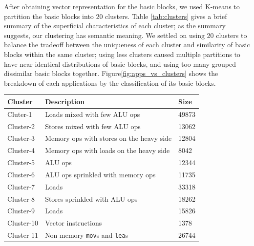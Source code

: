 After obtaining vector representation for the basic blocks, 
we used K-means\cite{kmeans} to partition the basic blocks into 20 clusters.
Table \ref{tab:clusters} gives a brief summary of the superficial characteristics
of each cluster; as the summary suggests, our clustering has semantic meaning.
We settled on using 20 clusters to balance
the tradeoff between the uniqueness of each cluster
and similarity of basic blocks within the same cluster;
using less clusters caused multiple partitions to have
near identical distributions of basic blocks,
and using too many grouped dissimilar basic blocks together.
Figure\ref{fig:apps_vs_clusters} shows the breakdown of each applications
by the classification of its basic blocks.
\begin{table}
\begin{tabular}{|p{}|p{}|p{}|}
    \hline
    Cluster & Description & Size \\
    \hline
    
    Cluter-1 & 
    Loads mixed with few ALU ops & 49873 \\
    \hline
    
    Cluster-2 &
    Stores mixed with few ALU ops & 13062 \\
    \hline
    
    Cluster-3 &
    Memory ops with stores on the heavy side & 12804 \\
    \hline
    
    Cluster-4 &
    Memory ops with loads on the heavy side & 8042 \\
    \hline
    
    Cluster-5 &
    ALU ops & 12344 \\
    \hline
    
    Cluster-6 &
    ALU ops sprinkled with memory ops & 11735 \\
    \hline
    
    Cluster-7 &
    Loads & 33318 \\
    \hline
    
    Cluster-8 &
    Stores sprinkled with ALU ops & 18262 \\
    \hline
    
    Cluster-9 &
    Loads & 15826 \\
    \hline
    
    Cluster-10 &
    Vector instructions & 1378 \\
    \hline
    
    Cluster-11 &
    Non-memory \verb|mov|s and \verb|lea|s & 26744 \\ 
    \hline
    

\end{tabular}
\end{table}
